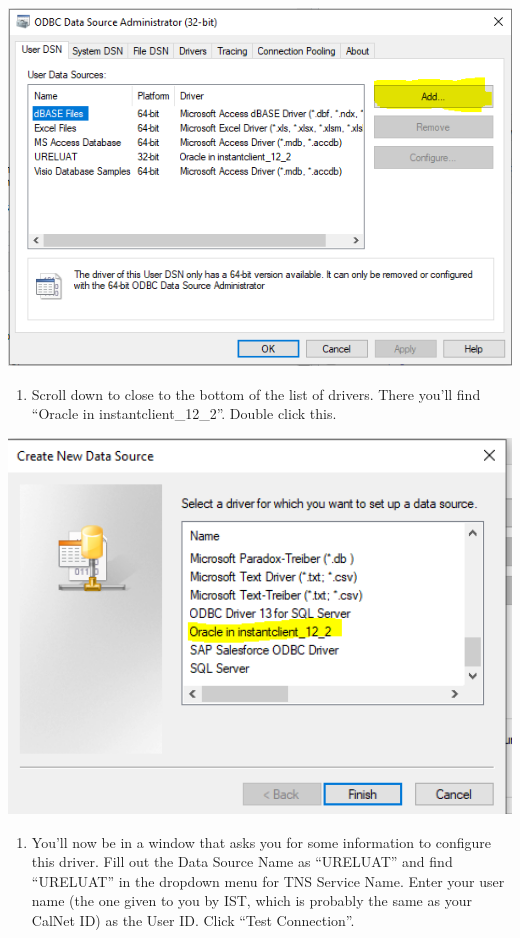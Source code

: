 \documentclass[]{book}
\providecommand{\tightlist}{%
  \setlength{\itemsep}{0pt}\setlength{\parskip}{0pt}}
\begin{document}
\includegraphics[width=8.26in]{images/odbc}

\begin{enumerate}
\def\labelenumi{\arabic{enumi})}
\setcounter{enumi}{2}
\tightlist
\item
  Scroll down to close to the bottom of the list of drivers. There you'll find ``Oracle in instantclient\_12\_2''. Double click this.
\end{enumerate}

\includegraphics[width=6.5in]{images/oracle}

\begin{enumerate}
\def\labelenumi{\arabic{enumi})}
\setcounter{enumi}{3}
\tightlist
\item
  You'll now be in a window that asks you for some information to configure this driver. Fill out the Data Source Name as ``URELUAT'' and find ``URELUAT'' in the dropdown menu for TNS Service Name. Enter your user name (the one given to you by IST, which is probably the same as your CalNet ID) as the User ID. Click ``Test Connection''.
\end{enumerate}
\end{document}
